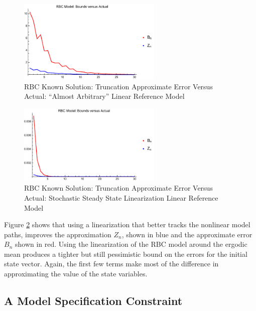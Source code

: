 \documentclass[12pt]{article}
\begin{document}
\begin{figure}
  \centering
\includegraphics[width=2.7in]{simpArbBoundsVActual.pdf}  
  \caption{RBC Known Solution: Truncation Approximate Error  Versus Actual: ``Almost Arbitrary'' Linear Reference Model}
  \label{rbcTrunc}
\end{figure}
\begin{figure}
  \centering
\includegraphics[width=2.7in]{simpBoundsVActual.pdf}  
  \caption{RBC Known Solution: Truncation Approximate Error Versus Actual: Stochastic Steady State Linearization Linear Reference Model}
  \label{rbcTruncSimp}
\end{figure}



Figure \ref{rbcTruncSimp} shows that using a 
linearization that better tracks the 
nonlinear model paths, improves the approximation $Z_n$, shown in blue  and the approximate error  $B_n$ shown in red.
Using the linearization of the RBC model around the ergodic mean produces a tighter but still  pessimistic bound on the errors for the initial state vector.
Again, the first few terms make most of the difference in approximating the value of the state variables.


\subsection{A Model Specification Constraint}
\label{sec:convenient}
\end{document}
